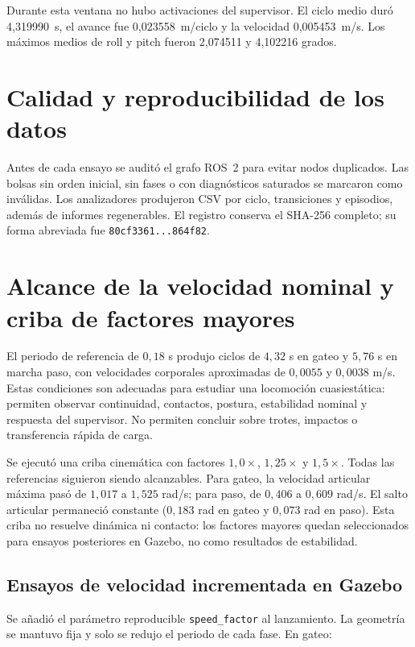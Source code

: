 Durante esta ventana no hubo activaciones del supervisor. El ciclo medio duró
4,319990~s, el avance fue 0,023558~m/ciclo y la velocidad 0,005453~m/s. Los
máximos medios de roll y pitch fueron 2,074511 y 4,102216 grados.

\section{Calidad y reproducibilidad de los datos}

Antes de cada ensayo se auditó el grafo ROS~2 para evitar nodos duplicados. Las
bolsas sin orden inicial, sin fases o con diagnósticos saturados se marcaron
como inválidas. Los analizadores produjeron CSV por ciclo, transiciones y
episodios, además de informes regenerables. El registro conserva el SHA-256
completo; su forma abreviada fue \texttt{80cf3361...864f82}.

\section{Alcance de la velocidad nominal y criba de factores mayores}

El periodo de referencia de $0{,}18$ s produjo ciclos de $4{,}32$ s en gateo y
$5{,}76$ s en marcha paso, con velocidades corporales aproximadas de
$0{,}0055$ y $0{,}0038$ m/s. Estas condiciones son adecuadas para estudiar una
locomoción cuasiestática: permiten observar continuidad, contactos, postura,
estabilidad nominal y respuesta del supervisor. No permiten concluir sobre
trotes, impactos o transferencia rápida de carga.

Se ejecutó una criba cinemática con factores $1{,}0\times$, $1{,}25\times$ y
$1{,}5\times$. Todas las referencias siguieron siendo alcanzables. Para gateo,
la velocidad articular máxima pasó de $1{,}017$ a $1{,}525$ rad/s; para paso,
de $0{,}406$ a $0{,}609$ rad/s. El salto articular permaneció constante
($0{,}183$ rad en gateo y $0{,}073$ rad en paso). Esta criba no resuelve
dinámica ni contacto: los factores mayores quedan seleccionados para ensayos
posteriores en Gazebo, no como resultados de estabilidad.

\subsection{Ensayos de velocidad incrementada en Gazebo}

Se añadió el parámetro reproducible \texttt{speed\_factor} al lanzamiento. La
geometría se mantuvo fija y solo se redujo el periodo de cada fase. En gateo:

